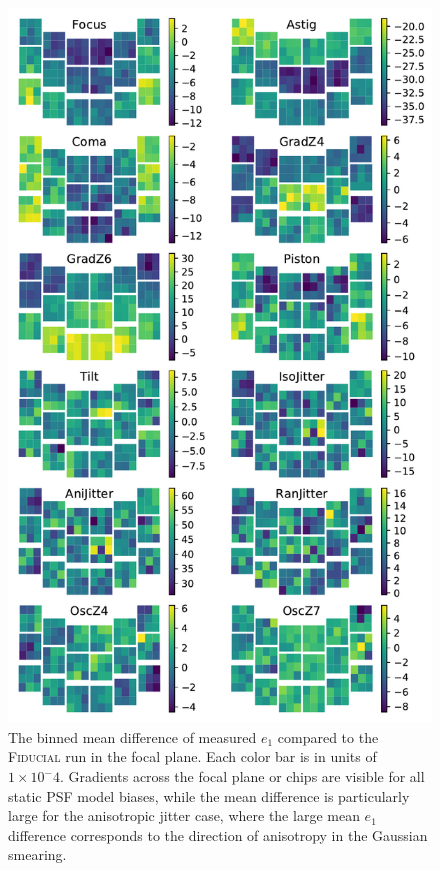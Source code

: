 \documentclass[aps,prd, amsmath,amssymb,superscriptaddress,showkeys,nofootinbib,reprint,preprintnumbers]{revtex4-1}
\begin{document}
\begin{figure}
\begin{center}
\includegraphics[width=\columnwidth]{figures/focal_mean_e1.pdf}
\end{center}
\caption[]{
The binned mean difference of measured $e_1$ compared to the \textsc{Fiducial} run in the focal plane. Each color bar is in units of $1\times 10^-4$. Gradients across the focal plane or chips are visible for all static PSF model biases, while the mean difference is particularly large for the anisotropic jitter case, where the large mean $e_1$ difference corresponds to the direction of anisotropy in the Gaussian smearing.
\label{fig:focal_mean_e1}}
\end{figure}
\end{document}
